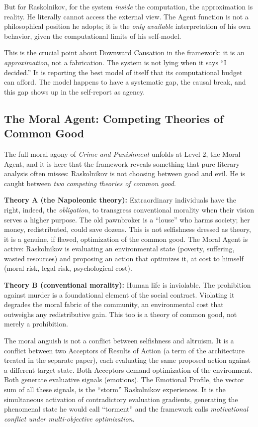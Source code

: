 But for Raskolnikov,  for the system \emph{inside} the computation,  the approximation is reality. He literally cannot access the external view. The Agent function is not a philosophical position he adopts; it is the \emph{only available} interpretation of his own behavior, given the computational limits of his self-model.

This is the crucial point about Downward Causation in the framework: it is an \emph{approximation}, not a fabrication. The system is not lying when it says ``I decided.'' It is reporting the best model of itself that its computational budget can afford. The model happens to have a systematic gap,  the causal break,  and this gap shows up in the self-report as agency.



\subsection*{The Moral Agent: Competing Theories of Common Good}


The full moral agony of \emph{Crime and Punishment} unfolds at Level 2,  the Moral Agent,  and it is here that the framework reveals something that pure literary analysis often misses: Raskolnikov is not choosing between good and evil. He is caught between \emph{two competing theories of common good}.

\textbf{Theory A (the Napoleonic theory):} Extraordinary individuals have the right,  indeed, the \emph{obligation},  to transgress conventional morality when their vision serves a higher purpose. The old pawnbroker is a ``louse'' who harms society; her money, redistributed, could save dozens. This is not selfishness dressed as theory,  it is a genuine, if flawed, optimization of the common good. The Moral Agent is active: Raskolnikov is evaluating an environmental state (poverty, suffering, wasted resources) and proposing an action that optimizes it, at cost to himself (moral risk, legal risk, psychological cost).

\textbf{Theory B (conventional morality):} Human life is inviolable. The prohibition against murder is a foundational element of the social contract. Violating it degrades the moral fabric of the community,  an environmental cost that outweighs any redistributive gain. This too is a theory of common good, not merely a prohibition.

The moral anguish is not a conflict between selfishness and altruism. It is a conflict between two Acceptors of Results of Action (a term of the architecture treated in the separate paper), each evaluating the same proposed action against a different target state. Both Acceptors demand optimization of the environment. Both generate evaluative signals (emotions). The Emotional Profile,  the vector sum of all these signals,  is the ``storm'' Raskolnikov experiences. It is the simultaneous activation of contradictory evaluation gradients, generating the phenomenal state he would call ``torment'' and the framework calls \emph{motivational conflict under multi-objective optimization}.

